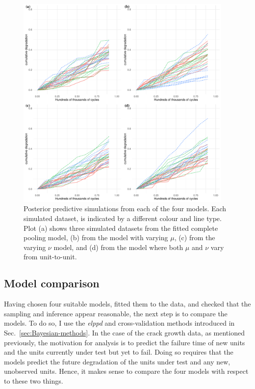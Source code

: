 \begin{figure}
   \centering
   \includegraphics[width=0.95\textwidth]{./figures/ch-5/post_pc.pdf}
   \caption{Posterior predictive simulations from each of the four models. Each simulated dataset, is indicated by a different colour and line type. Plot (a) shows three simulated datasets from the fitted complete pooling model, (b) from the model with varying $\mu$, (c) from the varying $\nu$ model, and (d) from the model where both $\mu$ and $\nu$ vary from unit-to-unit.}
   \label{fig:post-pc} 
\end{figure}

\subsection{Model comparison}
\label{subsec:modcomp}

Having chosen four suitable models, fitted them to the data, and checked that the sampling and inference appear reasonable, the next step is to compare the models. To do so, I use the \textit{elppd} and cross-validation methods introduced in Sec.~\ref{sec:Bayesian-methods}. In the case of the crack growth data, as mentioned previously, the motivation for analysis is to predict the failure time of new units and the units currently under test but yet to fail. Doing so requires that the models predict the future degradation of the units under test and any new, unobserved units. Hence, it makes sense to compare the four models with respect to these two things.

